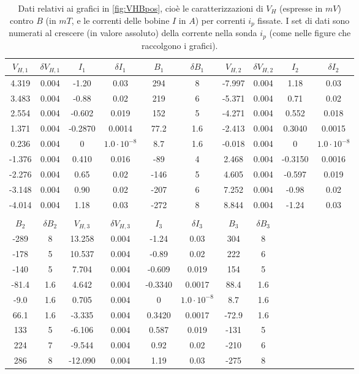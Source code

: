 \begin{table}
\centering \footnotesize
\begin{tabular}{cccccccccc}
$V_{H,1}$ & $\delta V_{H,1}$ & $I_1$ & $\delta I_1$ & $B_1$ & $\delta B_1$ & $V_{H,2}$ & $\delta V_{H,2}$ & $I_2$ & $\delta I_2$ \\
\hline
4.319 & 0.004 & -1.20 & 0.03 & 294 & 8 & -7.997 & 0.004 & 1.18 & 0.03\\
3.483 & 0.004 & -0.88 & 0.02 & 219 & 6 & -5.371 & 0.004 & 0.71 & 0.02\\
2.554 & 0.004 & -0.602 & 0.019 & 152 & 5 & -4.271 & 0.004 & 0.552 & 0.018\\
1.371 & 0.004 & -0.2870 & 0.0014 & 77.2 & 1.6 & -2.413 & 0.004 & 0.3040 & 0.0015\\
0.236 & 0.004 & 0 & $1.0 \cdot 10^{-8}$ & 8.7 & 1.6 & -0.018 & 0.004 & 0 & $1.0 \cdot 10^{-8}$\\
-1.376 & 0.004 & 0.410 & 0.016 & -89 & 4 & 2.468 & 0.004 & -0.3150 & 0.0016\\
-2.276 & 0.004 & 0.65 & 0.02 & -146 & 5 & 4.605 & 0.004 & -0.597 & 0.019\\
-3.148 & 0.004 & 0.90 & 0.02 & -207 & 6 & 7.252 & 0.004 & -0.98 & 0.02\\
-4.014 & 0.004 & 1.18 & 0.03 & -272 & 8 & 8.844 & 0.004 & -1.24 & 0.03\\
       &&&&&&&&& \\
$B_2$ & $\delta B_2$ & $V_{H,3}$ & $\delta V_{H,3}$ & $I_3$ & $\delta I_3$ & $B_3$ & $\delta B_3$ \\
\hline
-289 & 8 & 13.258 & 0.004 & -1.24 & 0.03 & 304 & 8\\
-178 & 5 & 10.537 & 0.004 & -0.89 & 0.02 & 222 & 6\\
-140 & 5 & 7.704 & 0.004 & -0.609 & 0.019 & 154 & 5\\
-81.4 & 1.6 & 4.642 & 0.004 & -0.3340 & 0.0017 & 88.4 & 1.6\\
-9.0 & 1.6 & 0.705 & 0.004 & 0 & $1.0 \cdot 10^{-8}$ & 8.7 & 1.6\\
66.1 & 1.6 & -3.335 & 0.004 & 0.3420 & 0.0017 & -72.9 & 1.6\\
133 & 5 & -6.106 & 0.004 & 0.587 & 0.019 & -131 & 5\\
224 & 7 & -9.544 & 0.004 & 0.92 & 0.02 & -210 & 6\\
286 & 8 & -12.090 & 0.004 & 1.19 & 0.03 & -275 & 8 &&
\end{tabular}
\caption{Dati relativi ai grafici in \cref{fig:VHBpos}, cioè le caratterizzazioni di $ V_H $ (espresse in $ \unit{mV} $) contro $ B $ (in $ \unit{mT} $, e le correnti delle bobine $ I $ in $ \unit{A} $) per correnti $ i_p $ fissate. I set di dati sono numerati al crescere (in valore assoluto) della corrente nella sonda $ i_p $ (come nelle figure che raccolgono i grafici).}
\label{tab:VHBpos}
\end{table}

